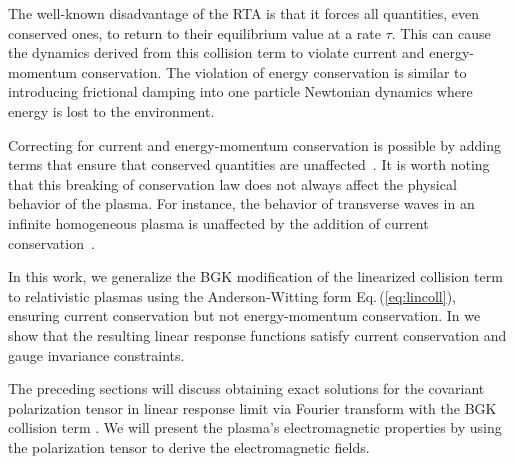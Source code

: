 The well-known disadvantage of the RTA is that it forces all quantities, even conserved ones, to return to their equilibrium value at a rate $\tau$. This can cause the dynamics derived from this collision term to violate current and energy-momentum conservation. The violation of energy conservation is similar to introducing frictional damping into one particle Newtonian dynamics where energy is lost to the environment.

Correcting for current and energy-momentum conservation is possible by adding terms that ensure that conserved quantities are unaffected~\cite{Bhatnagar:1954zz,Greene1973,Rocha:2021zcw,Singha:2023eia}. It is worth noting that this breaking of conservation law does not always affect the physical behavior of the plasma. For instance, the behavior of transverse waves in an infinite homogeneous plasma is unaffected by the addition of current conservation~\cite{Formanek:2021blc}.

In this work, we generalize the BGK modification of the linearized collision term to relativistic plasmas using the Anderson-Witting form Eq.\,(\ref{eq:lincoll}), ensuring current conservation  but not energy-momentum conservation. In \cite{Formanek:2021blc} we show that the resulting linear response functions satisfy current conservation and gauge invariance constraints. 

The preceding sections will discuss obtaining exact solutions for the covariant polarization tensor in linear response limit via Fourier transform with the BGK collision term . We will present the plasma's electromagnetic properties by using the polarization tensor to derive the electromagnetic fields.

